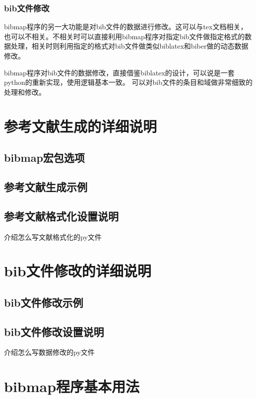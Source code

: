 \documentclass{article}
\begin{document}
\subsubsection{bib文件修改}

bibmap程序的另一大功能是对bib文件的数据进行修改。这可以与tex文档相关，也可以不相关。不相关时可以直接利用bibmap程序对指定bib文件做指定格式的数据处理，相关时则利用指定的格式对bib文件做类似biblatex和biber做的动态数据修改。

bibmap程序对bib文件的数据修改，直接借鉴biblatex的设计，可以说是一套python的重新实现，使用逻辑基本一致。
可以对bib文件的条目和域做非常细致的处理和修改。

\section{参考文献生成的详细说明}

\subsection{bibmap宏包选项}


\subsection{参考文献生成示例}


\subsection{参考文献格式化设置说明}

介绍怎么写文献格式化的py文件


\section{bib文件修改的详细说明}

\subsection{bib文件修改示例}


\subsection{bib文件修改设置说明}

介绍怎么写数据修改的py文件


\section{bibmap程序基本用法}
\end{document}
